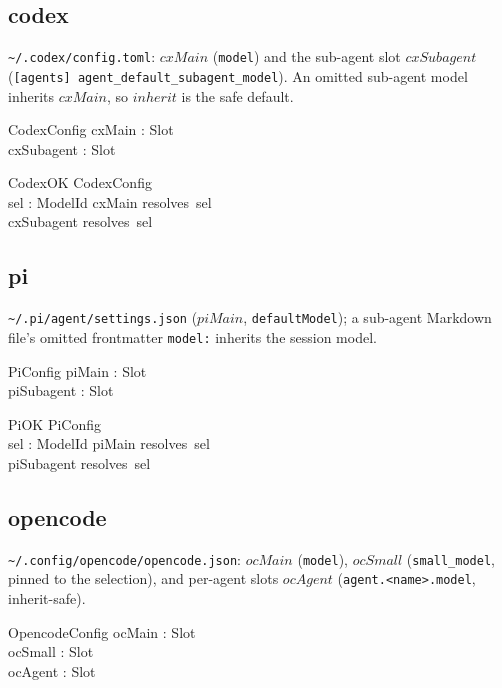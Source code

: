 \documentclass{article}
\begin{document}
\subsection{codex}

\texttt{\~{}/.codex/config.toml}: $cxMain$ (\texttt{model}) and the sub-agent
slot $cxSubagent$ (\texttt{[agents] agent\_default\_subagent\_model}). An omitted
sub-agent model inherits $cxMain$, so $inherit$ is the safe default.

\begin{schema}{CodexConfig}
  cxMain : Slot \\
  cxSubagent : Slot
\end{schema}

\begin{schema}{CodexOK}
  CodexConfig \\
  sel : ModelId
\where
  cxMain \in resolves~sel \\
  cxSubagent \in resolves~sel
\end{schema}

\subsection{pi}

\texttt{\~{}/.pi/agent/settings.json} ($piMain$, \texttt{defaultModel}); a
sub-agent Markdown file's omitted frontmatter \texttt{model:} inherits the
session model.

\begin{schema}{PiConfig}
  piMain : Slot \\
  piSubagent : Slot
\end{schema}

\begin{schema}{PiOK}
  PiConfig \\
  sel : ModelId
\where
  piMain \in resolves~sel \\
  piSubagent \in resolves~sel
\end{schema}

\subsection{opencode}

\texttt{\~{}/.config/opencode/opencode.json}: $ocMain$ (\texttt{model}),
$ocSmall$ (\texttt{small\_model}, pinned to the selection), and per-agent slots
$ocAgent$ (\texttt{agent.<name>.model}, inherit-safe).

\begin{schema}{OpencodeConfig}
  ocMain : Slot \\
  ocSmall : Slot \\
  ocAgent : Slot
\end{schema}
\end{document}
